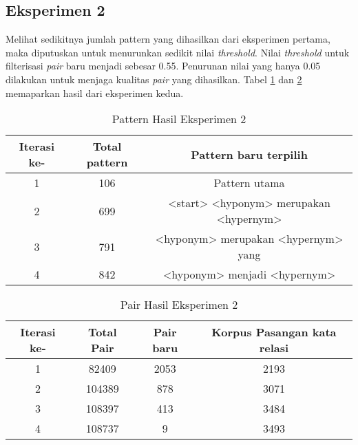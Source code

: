 \subsection{Eksperimen 2}
Melihat sedikitnya jumlah pattern yang dihasilkan dari eksperimen pertama, maka diputuskan untuk menurunkan sedikit nilai \textit{threshold}. Nilai \textit{threshold} untuk filterisasi \textit{pair} baru menjadi sebesar 0.55. Penurunan nilai yang hanya 0.05 dilakukan untuk menjaga kualitas \textit{pair} yang dihasilkan. Tabel \ref{table:eksp2-pattern} dan \ref{table:eksp2-pair} memaparkan hasil dari eksperimen kedua.

\begin{table}
  \centering
  \caption{Pattern Hasil Eksperimen 2}
  \label{table:eksp2-pattern}
  \begin{tabular}{|c|c|c|}
  \hline
    Iterasi ke- & Total pattern & Pattern baru terpilih \\ \hline
    1 & 106 & Pattern utama \\ \hline
    2 & 699 & <start> <hyponym> merupakan <hypernym> \\ \hline
    3 & 791 & <hyponym> merupakan <hypernym> yang \\ \hline
    4 & 842 & <hyponym> menjadi <hypernym> \\ \hline
  \end{tabular} 
\end{table}

\begin{table}
  \centering
  \caption{Pair Hasil Eksperimen 2}
  \label{table:eksp2-pair}
  \begin{tabular}{|c|c|c|c|}
  \hline
  Iterasi ke-  & Total Pair & Pair baru & Korpus Pasangan kata relasi \\ \hline
  1 & 82409 & 2053 & 2193 \\ \hline
  2 & 104389 & 878 & 3071 \\ \hline
  3 & 108397 & 413 & 3484 \\ \hline
  4 & 108737 & 9 & 3493 \\ \hline
  \end{tabular} 
\end{table}

